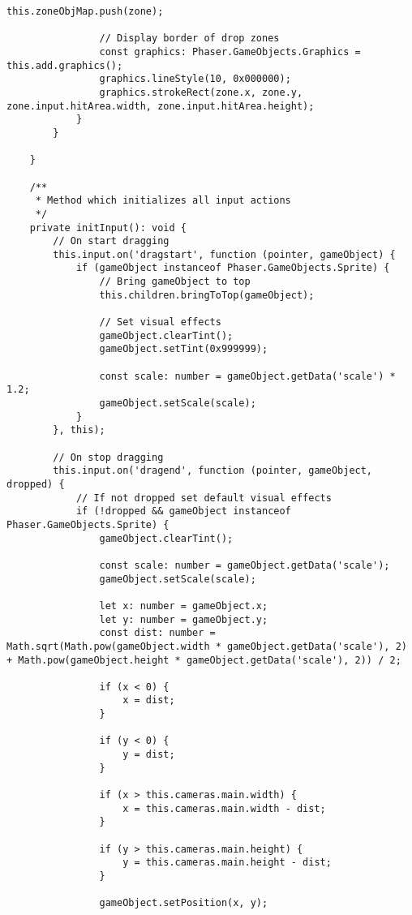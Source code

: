 \begin{lstlisting}[style=TypeScript, caption={restrictedSortingScene.ts}]
                this.zoneObjMap.push(zone);

                // Display border of drop zones
                const graphics: Phaser.GameObjects.Graphics = this.add.graphics();
                graphics.lineStyle(10, 0x000000);
                graphics.strokeRect(zone.x, zone.y, zone.input.hitArea.width, zone.input.hitArea.height);
            }
        }

    }

    /**
     * Method which initializes all input actions
     */
    private initInput(): void {
        // On start dragging
        this.input.on('dragstart', function (pointer, gameObject) {
            if (gameObject instanceof Phaser.GameObjects.Sprite) {
                // Bring gameObject to top
                this.children.bringToTop(gameObject);

                // Set visual effects
                gameObject.clearTint();
                gameObject.setTint(0x999999);

                const scale: number = gameObject.getData('scale') * 1.2;
                gameObject.setScale(scale);
            }
        }, this);

        // On stop dragging
        this.input.on('dragend', function (pointer, gameObject, dropped) {
            // If not dropped set default visual effects
            if (!dropped && gameObject instanceof Phaser.GameObjects.Sprite) {
                gameObject.clearTint();

                const scale: number = gameObject.getData('scale');
                gameObject.setScale(scale);

                let x: number = gameObject.x;
                let y: number = gameObject.y;
                const dist: number = Math.sqrt(Math.pow(gameObject.width * gameObject.getData('scale'), 2) + Math.pow(gameObject.height * gameObject.getData('scale'), 2)) / 2;

                if (x < 0) {
                    x = dist;
                }

                if (y < 0) {
                    y = dist;
                }

                if (x > this.cameras.main.width) {
                    x = this.cameras.main.width - dist;
                }

                if (y > this.cameras.main.height) {
                    y = this.cameras.main.height - dist;
                }

                gameObject.setPosition(x, y);


\end{lstlisting}
